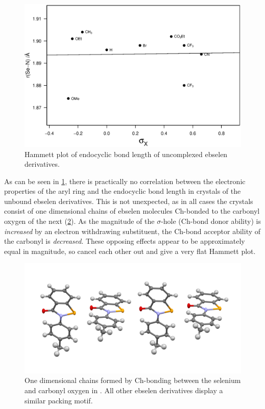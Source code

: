 \begin{refsection}
\begin{figure}
    \centering
    \includegraphics[width=0.9\linewidth]{Figures/hammett-endo-free.eps}
    \caption{Hammett plot of endocyclic  bond length of uncomplexed ebselen derivatives.}
    \label{fig:hammett-endo-free}
\end{figure}

As can be seen in \ref{fig:hammett-endo-free}, there is practically no correlation between the electronic properties of the aryl ring and the endocyclic  bond length in crystals of the unbound ebselen derivatives.
This is not unexpected, as in all cases the crystals consist of one dimensional chains of ebselen molecules Ch-bonded to the carbonyl oxygen of the next (\ref{fig:ebs-packing}).
As the magnitude of the $\sigma$-hole (Ch-bond donor ability) is \emph{increased} by an electron withdrawing substituent, the Ch-bond acceptor ability of the carbonyl is \emph{decreased}.
These opposing effects appear to be approximately equal in magnitude, so cancel each other out and give a very flat Hammett plot.

\begin{figure}
    \centering
    \includegraphics[width=0.6\linewidth]{Figures/ebs.me-packing.png}
    \caption{One dimensional chains formed by Ch-bonding between the selenium and carbonyl oxygen in . All other ebselen derivatives display a similar packing motif.}
    \label{fig:ebs-packing}
\end{figure}


\end{refsection}
